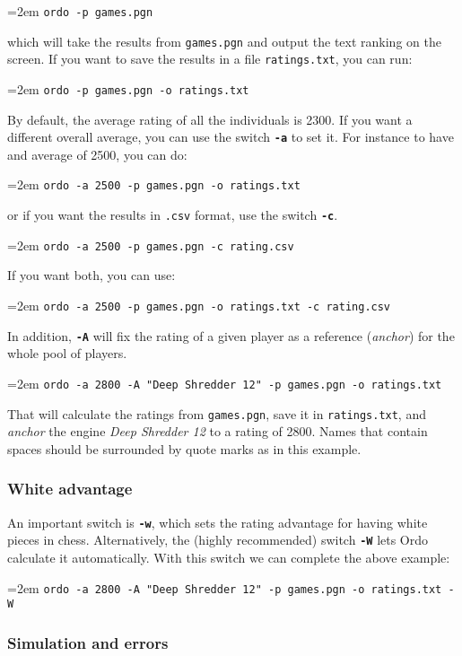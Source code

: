 \documentclass[12pt]{article}
\newcommand{\swtch} [1] {\texttt{\textbf{#1}}}
\newcommand{\filename} [1] {\texttt{#1}}
\newcommand{\cmdln}[1]{
	\par
	\begingroup
		\leftskip=2em
		\addtolength{\rightskip}{0em}
		\noindent \small{\texttt{#1}}
		\par
	\endgroup
}
\begin{document}
	\cmdln{ordo -p games.pgn}

which will take the results from \filename{games.pgn} and output the text ranking on the screen. 
If you want to save the results in a file \filename{ratings.txt}, you can run:

	\cmdln{ordo -p games.pgn -o ratings.txt}

By default, the average rating of all the individuals is 2300. 
If you want a different overall average, you can use the switch \swtch{-a} to set it. 
For instance to have and average of 2500, you can do:
	
	\cmdln{ordo -a 2500 -p games.pgn -o ratings.txt}

or if you want the results in \filename{.csv} format, use the switch \swtch{-c}.

	\cmdln{ordo -a 2500 -p games.pgn -c rating.csv}

If you want both, you can use:

	\cmdln{ordo -a 2500 -p games.pgn -o ratings.txt -c rating.csv}

In addition, \swtch{-A} will fix the rating of a given player as a reference (\textit{anchor}) for the whole pool of players.

	\cmdln{ordo -a 2800 -A "Deep Shredder 12" -p games.pgn -o ratings.txt}

That will calculate the ratings from \filename{games.pgn}, save it in \filename{ratings.txt}, and \textit{anchor} the engine \textit{Deep Shredder 12} to a rating of 2800.
Names that contain spaces should be surrounded by quote marks as in this example.

\subsubsection*{White advantage}
An important switch is \swtch{-w}, which sets the rating advantage for having white pieces in chess. 
Alternatively, the (highly recommended) switch \swtch{-W} lets Ordo calculate it automatically. 
With this switch we can complete the above example:

\cmdln{ordo -a 2800 -A "Deep Shredder 12" -p games.pgn -o ratings.txt -W}

\subsubsection*{Simulation and errors}
\end{document}
